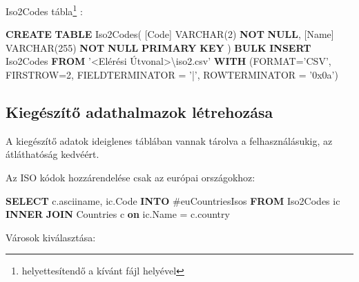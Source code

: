 \documentclass[
]{article}
\newenvironment{Shaded}{\begin{snugshade}}{\end{snugshade}}
\newcommand{\DataTypeTok}[1]{\textcolor[rgb]{0.56,0.13,0.00}{#1}}
\newcommand{\DecValTok}[1]{\textcolor[rgb]{0.25,0.63,0.44}{#1}}
\newcommand{\KeywordTok}[1]{\textcolor[rgb]{0.00,0.44,0.13}{\textbf{#1}}}
\newcommand{\NormalTok}[1]{#1}
\newcommand{\OperatorTok}[1]{\textcolor[rgb]{0.40,0.40,0.40}{#1}}
\newcommand{\StringTok}[1]{\textcolor[rgb]{0.25,0.44,0.63}{#1}}
\begin{document}
Iso2Codes tábla\footnote{\emph{} helyettesítendő a kívánt fájl helyével}
:

\begin{Shaded}
\begin{Highlighting}[]
\KeywordTok{CREATE} \KeywordTok{TABLE}\NormalTok{ Iso2Codes(}
\NormalTok{    [Code] }\DataTypeTok{VARCHAR}\NormalTok{(}\DecValTok{2}\NormalTok{) }\KeywordTok{NOT} \KeywordTok{NULL}\NormalTok{,}
\NormalTok{    [Name] }\DataTypeTok{VARCHAR}\NormalTok{(}\DecValTok{255}\NormalTok{) }\KeywordTok{NOT} \KeywordTok{NULL} \KeywordTok{PRIMARY} \KeywordTok{KEY}
\NormalTok{)}
\KeywordTok{BULK} \KeywordTok{INSERT}\NormalTok{ Iso2Codes}
\KeywordTok{FROM} \StringTok{'<Elérési Útvonal>\textbackslash{}iso2.csv'}
\KeywordTok{WITH}\NormalTok{ (FORMAT}\OperatorTok{=}\StringTok{'CSV'}\NormalTok{,}
\NormalTok{    FIRSTROW}\OperatorTok{=}\DecValTok{2}\NormalTok{,}
\NormalTok{    FIELDTERMINATOR }\OperatorTok{=} \StringTok{'|'}\NormalTok{,}
\NormalTok{    ROWTERMINATOR }\OperatorTok{=} \StringTok{'0x0a'}\NormalTok{)}
\end{Highlighting}
\end{Shaded}

\hypertarget{kieguxe9szuxedtux151-adathalmazok-luxe9trehozuxe1sa}{%
\subsection{Kiegészítő adathalmazok
létrehozása}\label{kieguxe9szuxedtux151-adathalmazok-luxe9trehozuxe1sa}}

A kiegészítő adatok ideiglenes táblában vannak tárolva a
felhasználásukig, az átláthatóság kedvéért.

Az ISO kódok hozzárendelése csak az európai országokhoz:

\begin{Shaded}
\begin{Highlighting}[]
\KeywordTok{SELECT}\NormalTok{ c.asciiname, ic.Code}
\KeywordTok{INTO}\NormalTok{ #euCountriesIsos}
\KeywordTok{FROM}\NormalTok{ Iso2Codes ic}
\KeywordTok{INNER} \KeywordTok{JOIN}\NormalTok{ Countries c }\KeywordTok{on}\NormalTok{ ic.Name }\OperatorTok{=}\NormalTok{ c.country}
\end{Highlighting}
\end{Shaded}

Városok kiválasztása:
\end{document}

